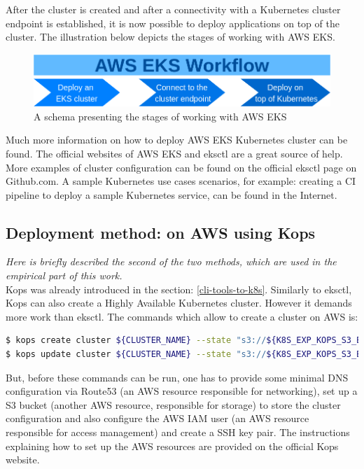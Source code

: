 After the cluster is created and after a connectivity with a Kubernetes cluster endpoint is established, it is now possible to deploy applications on top of the cluster. The illustration below depicts the stages of working with AWS EKS.
\begin{figure}[H]
    \centering
    \includegraphics[width=12cm]{figures/eks-workflow.png}
    \captionsetup{justification=centering,margin=2cm}
    \caption{A schema presenting the stages of working with AWS EKS}
\end{figure}

Much more information on how to deploy AWS EKS Kubernetes cluster can be found. The official websites of AWS EKS\cite{what-is-eks} and eksctl\cite{eksctl} are a great source of help. More examples of cluster configuration can be found on the official eksctl page on Github.com\cite{eks-gh}. A sample Kubernetes use cases scenarios, for example: creating a CI pipeline to deploy a sample Kubernetes service, can be found in the Internet\cite{eksworkshop}.


\subsection{Deployment method: on AWS using Kops}
\textit{Here is briefly described the second of the two methods, which are used in the empirical part of this work.}
\\

Kops was already introduced in the section: \ref{cli-tools-to-k8s}. Similarly to eksctl, Kops can also create a Highly Available Kubernetes cluster. However it demands more work than eksctl. The commands which allow to create a cluster on AWS is\cite{book-mastering-k8s}:
\begin{lstlisting}[basicstyle=\small,caption={The commands of Kops CLI tool used to create a Kubernetes cluster configuration and then to deploy the cluster},captionpos=b,language=Bash,xleftmargin=1cm]
$ kops create cluster ${CLUSTER_NAME} --state "s3://${K8S_EXP_KOPS_S3_BUCKET}" --cloud=aws --zones=us-east-1c
$ kops update cluster ${CLUSTER_NAME} --state "s3://${K8S_EXP_KOPS_S3_BUCKET}" --yes
\end{lstlisting}
But, before these commands can be run, one has to provide some minimal DNS configuration via Route53 (an AWS resource responsible for networking), set up a S3 bucket (another AWS resource, responsible for storage) to store the cluster configuration\cite{book-mastering-k8s} and also configure the AWS IAM user (an AWS resource responsible for access management) and create a SSH key pair\cite{online-kops-aws}. The instructions explaining how to set up the AWS resources are provided on the official Kops website\cite{online-kops-aws}.

